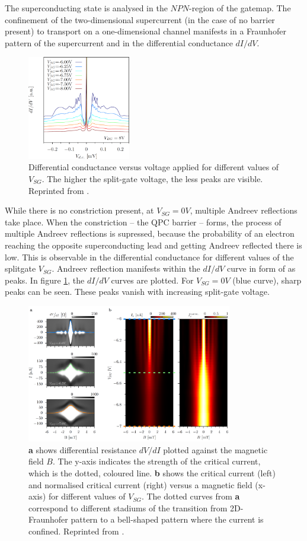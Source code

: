 The superconducting state is analysed in the $NPN$-region of the gatemap. The confinement of the two-dimensional supercurrent (in the case of no barrier present) to transport on a one-dimensional channel manifests in a Fraunhofer pattern of the supercurrent and in the differential conductance $dI/dV$. 
\begin{figure}
\centering
\includegraphics[width=0.4\textwidth]{figure/experiment/mar}
\caption{Differential conductance versus voltage applied for different values of $V_{SG}$. The higher the split-gate voltage, the less peaks are visible. Reprinted from \cite{Kraft2017}.}\label{fig:mar}
\end{figure}
While there is no constriction present, at $V_{SG} = 0 V$, multiple Andreev reflections take place. When the constriction -- the QPC barrier -- forms, the process of multiple Andreev reflections is supressed, because the probability of an electron reaching the opposite superconducting lead and getting Andreev reflected there is low. This is observable in the differential conductance for different values of the splitgate $V_{SG}$. Andreev reflection manifests within the $dI/dV$ curve in form of as peaks. In figure \ref{fig:mar}, the $dI/dV$ curves are plotted. For $V_{SG} = 0 V$ (blue curve), sharp peaks can be seen. These peaks vanish with increasing split-gate voltage.
\begin{figure}
\centering
\includegraphics[width=0.8\textwidth]{figure/experiment/supercurrent}
\caption{\textbf{a} shows differential resistance $dV/dI$ plotted against the magnetic field $B$. The y-axis indicates the strength of the critical current, which is the dotted, coloured line. \textbf{b} shows the critical current (left) and normalised critical current (right) versus a magnetic field (x-axis) for different values of $V_{SG}$. The dotted curves from \textbf{a} correspond to different stadiums of the transition from 2D-Fraunhofer pattern to a bell-shaped pattern where the current is confined. Reprinted from \cite{Kraft2017}.}\label{fig:supercurrent}
\end{figure}
